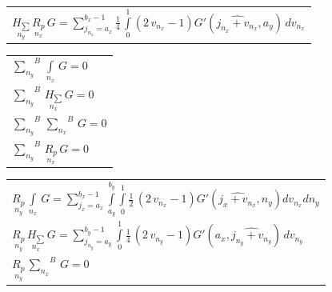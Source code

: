 \documentclass[twoside, 10pt, ptm]{article}
\begin{document}
\begin{multicols}{2}
\begin{center}
\begin{tabular}{ l }
$\underset{n_y}{H_{\sum}}\,\underset{n_x}{R_{p}}\,G = {\sum\limits_{j_{n_{x}}=a_{x}}^{b_{x} - 1} \frac{1}{4} \, \int\limits_{0}^{1} \left(2 \, v_{n_{x}} - 1 \right) G'\left(\widehat{j_{n_{x}} + v_{n_{x}}}, a_{y}\right)\,{d v_{n_{x}}} }$ \\


\end{tabular}
\end{center}

    \begin{center}
\begin{tabular}{ l }


${\sum\limits_{n_y}^{}}^{B}\,\int\limits_{n_x}^{}\,G = 0$ \\

${\sum\limits_{n_y}^{}}^{B}\,\underset{n_x}{H_{\sum}}\,G = 0$ \\

${\sum\limits_{n_y}^{}}^{B}\,{\sum\limits_{n_x}^{}}^{B}\,G = 0$ \\

${\sum\limits_{n_y}^{}}^{B}\,\underset{n_x}{R_{p}}\,G = 0$ \\


\end{tabular}
\end{center}

    \begin{center}
\begin{tabular}{ l }


$\underset{n_y}{R_{p}}\,\int\limits_{n_x}^{}\,G = {\sum\limits_{j_{x}=a_{x}}^{b_{x} - 1} \int\limits_{a_{y}}^{b_{y}} \int\limits_{0}^{1} \frac{1}{2} \, {\left(2 \, v_{n_{x}} - 1\right)} G'\left(\widehat{j_{x} + v_{n_{x}}}, n_{y}\right){d v_{n_{x}}}{d n_{y}}}$ \\

$\underset{n_y}{R_{p}}\,\underset{n_x}{H_{\sum}}\,G = {\sum\limits_{j_{n_{y}}=a_{y}}^{b_{y} - 1} \int\limits_{0}^{1} \frac{1}{4} \, {\left(2 \, v_{n_{y}} - 1\right)} G'\left(a_{x}, \widehat{j_{n_{y}} + v_{n_{y}}}\right)\,{d v_{n_{y}}}}$ \\

$\underset{n_y}{R_{p}}\,{\sum\limits_{n_x}^{}}^{B}\,G = 0$ \\




\end{tabular}
\end{center}
\end{multicols}
\end{document}
